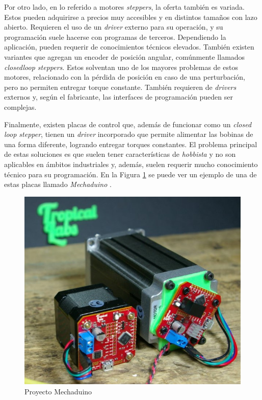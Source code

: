 Por otro lado, en lo referido a motores \textit{steppers}, la oferta también es variada. Estos pueden adquirirse a precios muy accesibles y en distintos tamaños con lazo abierto. Requieren el uso de un \textit{driver} externo para su operación, y su programación suele hacerse con programas de terceros. Dependiendo la aplicación, pueden requerir de conocimientos técnicos elevados. También existen variantes que agregan un encoder de posición angular, comúnmente llamados \textit{closedloop steppers}. Estos solventan uno de los mayores problemas de estos motores, relacionado con la pérdida de posición en caso de una perturbación, pero no permiten entregar torque constante. También requieren de \textit{drivers} externos y, según el fabricante, las interfaces de programación pueden ser complejas.

Finalmente, existen placas de control que, además de funcionar como un \textit{closed loop stepper}, tienen un \textit{driver} incorporado que permite alimentar las bobinas de una forma diferente, logrando entregar torques constantes. El problema principal de estas soluciones es que suelen tener características de \textit{hobbista} y no son aplicables en ámbitos industriales y, además, suelen requerir mucho conocimiento técnico para su programación. En la Figura \ref{fig:mechaduino} se puede ver un ejemplo de una de estas placas llamado \textit{Mechaduino} \citep{web_mechaduino}.

\begin{figure}[htbp]
	\centering
	\includegraphics[scale=.6]{./Figures/mechaduino.jpg}
	\caption{Proyecto Mechaduino\protect\footnotemark}
	\label{fig:mechaduino}
\end{figure}

